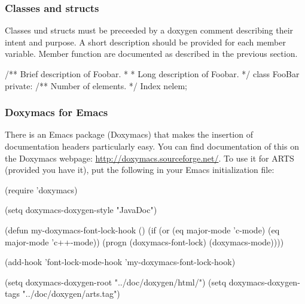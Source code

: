\subsubsection{Classes and structs}

Classes und structs must be preceeded by a doxygen comment describing their
intent and purpose. A short description should be provided for each member
variable. Member function are documented as described in the previous section.

\begin{code}
/** Brief description of Foobar.
 *
 * Long description of Foobar.
 */
class FooBar {
 private:
  /** Number of elements. */
  Index nelem;
}
\end{code}

\subsubsection{Doxymacs for Emacs}
There is an Emacs package (Doxymacs) that makes the insertion of
documentation headers particularly easy. You can find documentation of
this on the Doxymacs webpage: \url{http://doxymacs.sourceforge.net/}.
To use it for ARTS (provided you have it), put the following in your
Emacs initialization file:

\begin{code}
    (require 'doxymacs)

    (setq doxymacs-doxygen-style "JavaDoc")

    (defun my-doxymacs-font-lock-hook ()
    (if (or (eq major-mode 'c-mode) (eq major-mode 'c++-mode))
    (progn
    (doxymacs-font-lock)
    (doxymacs-mode))))

    (add-hook 'font-lock-mode-hook 'my-doxymacs-font-lock-hook)

    (setq doxymacs-doxygen-root "../doc/doxygen/html/")
    (setq doxymacs-doxygen-tags "../doc/doxygen/arts.tag")
\end{code}


